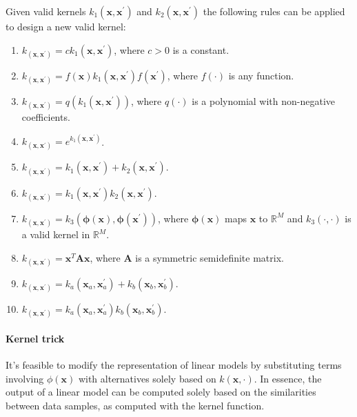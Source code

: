 Given valid kernels $k_1(\textbf{x},\textbf{x}^\prime)$ and $k_2(\textbf{x},\textbf{x}^\prime)$ the following rules can be applied to design a new valid kernel:
\begin{enumerate}
    \item $k_(\textbf{x},\textbf{x}^\prime)=ck_1(\textbf{x},\textbf{x}^\prime)$, where $c>0$ is a constant. 
    \item $k_(\textbf{x},\textbf{x}^\prime)=f(\textbf{x})k_1(\textbf{x},\textbf{x}^\prime)f(\textbf{x}^\prime)$, where $f(\cdot)$ is any function. 
    \item $k_(\textbf{x},\textbf{x}^\prime)=q\left( k_1(\textbf{x},\textbf{x}^\prime) \right)$, where $q(\cdot)$ is a polynomial with non-negative coefficients. 
    \item $k_(\textbf{x},\textbf{x}^\prime)=e^{k_1(\textbf{x},\textbf{x}^\prime)}$. 
    \item $k_(\textbf{x},\textbf{x}^\prime)=k_1(\textbf{x},\textbf{x}^\prime)+k_2(\textbf{x},\textbf{x}^\prime)$. 
    \item $k_(\textbf{x},\textbf{x}^\prime)=k_1(\textbf{x},\textbf{x}^\prime)k_2(\textbf{x},\textbf{x}^\prime)$. 
    \item $k_(\textbf{x},\textbf{x}^\prime)=k_3(\boldsymbol{\phi}(\textbf{x}),\boldsymbol{\phi}(\textbf{x}^\prime))$, where $\boldsymbol{\phi}(\textbf{x})$ maps $\textbf{x}$ to $\mathbb{R}^M$ and $k_3(\cdot,\cdot)$ is a valid kernel in $\mathbb{R}^M$. 
    \item $k_(\textbf{x},\textbf{x}^\prime)=\textbf{x}^T\textbf{A}\textbf{x}$, where $\textbf{A}$ is a symmetric semidefinite matrix. 
    \item $k_(\textbf{x},\textbf{x}^\prime)=k_a(\textbf{x}_a,\textbf{x}_a^\prime)+k_b(\textbf{x}_b,\textbf{x}_b^\prime)$. 
    \item $k_(\textbf{x},\textbf{x}^\prime)=k_a(\textbf{x}_a,\textbf{x}_a^\prime)k_b(\textbf{x}_b,\textbf{x}_b^\prime)$.
\end{enumerate}

\paragraph*{Kernel trick}
It's feasible to modify the representation of linear models by substituting terms involving $\phi(\textbf{x})$ with alternatives solely based on $k(\textbf{x},\cdot)$.
In essence, the output of a linear model can be computed solely based on the similarities between data samples, as computed with the kernel function.

